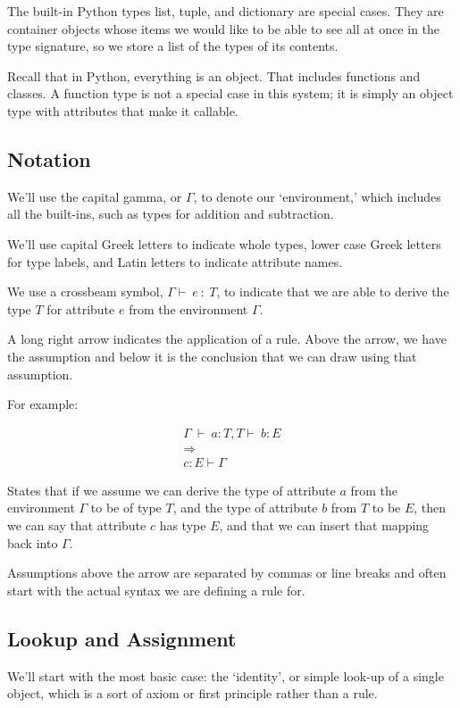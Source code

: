 \documentclass{article}
\begin{document}
The built-in Python types list, tuple, and dictionary are special cases. They
are container objects whose items we would like to be able to see all at once
in the type signature, so we store a list of the types of its contents.

Recall that in Python, everything is an object. That includes functions and
classes. A function type is not a special case in this system; it is simply an
object type with attributes that make it callable.

\subsection*{Notation}

We'll use the capital gamma, or $\Gamma$, to denote our `environment,' which
includes all the built-ins, such as types for addition and subtraction.

We'll use capital Greek letters to indicate whole types, lower case Greek
letters for type labels, and Latin letters to indicate attribute names.

We use a crossbeam symbol, $\Gamma \vdash\ e\ :\ T$, to indicate that we are able
to derive the type $T$ for attribute $e$ from the environment $\Gamma$.

A long right arrow indicates the application of a rule. Above the arrow, we
have the assumption and below it is the conclusion that we can draw using that
assumption.

For example:

\begin{align*}
\Gamma\ \vdash\ a:T, T \vdash\ b:E\\
\Longrightarrow \\
c:E \vdash \Gamma
\end{align*}

States that if we assume we can derive the type of attribute $a$ from the
environment $\Gamma$ to be of type $T$, and the type of attribute $b$ from $T$ to be $E$, then we can say that attribute $c$ has type $E$, and that we can insert that mapping back into $\Gamma$.

Assumptions above the arrow are separated by commas or line breaks and often
start with the actual syntax we are defining a rule for.

\subsection*{Lookup and Assignment}

We'll start with the most basic case: the `identity', or simple look-up of a
single object, which is a sort of axiom or first principle rather than a rule.
\end{document}

